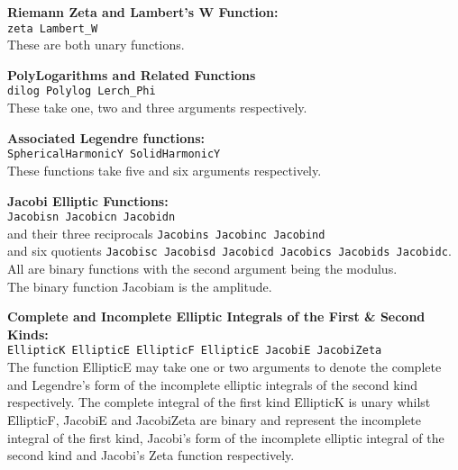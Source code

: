  
\textbf{Riemann Zeta and Lambert's W Function:}\\
\texttt{zeta  Lambert\_W}\\
These are both unary functions.

 
\textbf{PolyLogarithms and Related Functions}\\
\texttt{dilog Polylog Lerch\_Phi}\\
These take one, two and three arguments respectively.

\textbf{Associated Legendre functions:}\\
\texttt{SphericalHarmonicY SolidHarmonicY}\\
These functions take five and six arguments respectively.

\textbf{Jacobi Elliptic Functions:}\\
\texttt{Jacobisn Jacobicn Jacobidn}\\
and their three reciprocals \texttt{Jacobins Jacobinc Jacobind}\\
 and six quotients 
\texttt{Jacobisc Jacobisd Jacobicd Jacobics Jacobids Jacobidc}.\\
All are binary functions with the second argument being the modulus.\\
The binary function \f{Jacobiam} is the amplitude.

\textbf{Complete and Incomplete Elliptic Integrals of the First \& Second Kinds:}\\
\texttt{EllipticK EllipticE EllipticF  EllipticE  JacobiE JacobiZeta}\\ 
The function \f{EllipticE} may take one or two arguments to
denote the complete and Legendre's form of the incomplete elliptic integrals of
the second kind respectively. The complete integral of the first kind
\f{EllipticK} is unary whilst \f{EllipticF}, \f{JacobiE} and
\f{JacobiZeta} are binary and represent the incomplete integral of
the first kind, Jacobi's form of the incomplete elliptic integral of
the second kind and Jacobi's Zeta function respectively.


